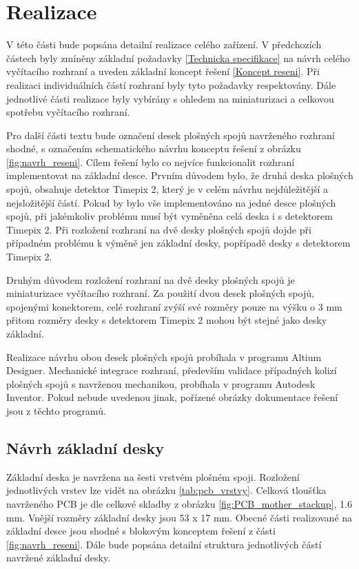 \chapter{Realizace}
\label{realizace}
V této části bude popsána detailní realizace celého zařízení. V předchozích částech byly zmíněny základní požadavky \ref{Technicka specifikace} na návrh celého vyčítacího rozhraní a uveden základní koncept řešení \ref{Koncept reseni}. Při realizaci individuálních částí rozhraní byly tyto požadavky respektovány. Dále jednotlivé části realizace byly vybírány s ohledem na miniaturizaci a celkovou spotřebu vyčítacího rozhraní. 

\par Pro další části textu bude označení desek plošných spojů navrženého rozhraní shodné, s označením schematického návrhu konceptu řešení z obrázku \ref{fig:navrh_reseni}. Cílem řešení bylo co nejvíce funkcionalit rozhraní implementovat na základní desce. Prvním důvodem bylo, že druhá deska plošných spojů, obsahuje detektor Timepix 2, který je v celém návrhu nejdůležitější a nejsložitější částí. Pokud by bylo vše implementováno na jedné desce plošných spojů, při jakémkoliv problému musí být vyměněna celá deska i s detektorem Timepix 2. Při rozložení rozhraní na dvě desky plošných spojů dojde při případném problému k výměně jen základní desky, popřípadě desky s detektorem Timepix 2. 
\par Druhým důvodem rozložení rozhraní na dvě desky plošných spojů je miniaturizace vyčítacího rozhraní. Za použití dvou desek plošných spojů, spojenými konektorem, celé rozhraní zvýší své rozměry pouze na výšku o 3 mm přitom rozměry desky s detektorem Timepix 2 mohou být stejné jako desky základní.

\par Realizace návrhu obou desek plošných spojů probíhala v programu Altium Designer. Mechanické integrace rozhraní, především validace případných kolizí plošných spojů s navrženou mechanikou, probíhala v programu Autodesk Inventor. Pokud nebude uvedenou jinak, pořízené obrázky dokumentace řešení jsou z těchto programů.

\section{Návrh základní desky}	
	\label{zakladni deska}
	Základní deska je navržena na šesti vrstvém plošném spoji. Rozložení jednotlivých vrstev lze vidět na obrázku \ref{tab:pcb_vrstvy}. Celková tloušťka navrženého PCB je dle celkové skladby z obrázku \ref{fig:PCB_mother_stackup}, 1.6 mm. Vnější rozměry základní desky jsou 53 x 17 mm. Obecné části realizované na základní desce jsou shodné s blokovým konceptem řešení z části \ref{fig:navrh_reseni}. Dále bude popsána detailní struktura jednotlivých částí navržené základní desky.

